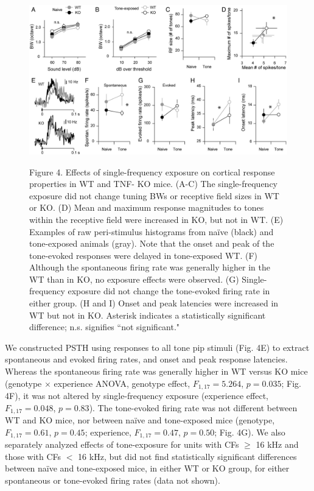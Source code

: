 \begin{figure}[h]
	\centering
		\includegraphics[width=6in]{images/C3F4}
	\begin{changemargin}{1in}{1in}
	\footnotesize{Figure 4. Effects of single-frequency exposure on cortical response properties in WT and TNF-\textalpha{} KO mice. (A-C) The single-frequency exposure did not change tuning BWs or receptive field sizes in WT or KO. (D) Mean and maximum response magnitudes to tones within the receptive field were increased in KO, but not in WT. (E) Examples of raw peri-stimulus histograms from na\"ive (black) and tone-exposed animals (gray). Note that the onset and peak of the tone-evoked responses were delayed in tone-exposed WT. (F) Although the spontaneous firing rate was generally higher in the WT than in KO, no exposure effects were observed. (G) Single-frequency exposure did not change the tone-evoked firing rate in either group. (H and I) Onset and peak latencies were increased in WT but not in KO. Asterisk indicates a statistically significant difference; n.s. signifies ``not significant."}
	\end{changemargin}
\end{figure}

We constructed PSTH using responses to all tone pip stimuli (Fig. 4E) to extract spontaneous and evoked firing rates, and onset and peak response latencies. Whereas the spontaneous firing rate was generally higher in WT versus KO mice (genotype $\times$ experience ANOVA, genotype effect, $F_{1,17}=5.264$, $p=0.035$; Fig. 4F), it was not altered by single-frequency exposure (experience effect, $F_{1,17}=0.048$, $p=0.83$). The tone-evoked firing rate was not different between WT and KO mice, nor between na\"ive and tone-exposed mice (genotype, $F_{1,17}=0.61$, $p=0.45$; experience, $F_{1,17}=0.47$, $p=0.50$; Fig. 4G). We also separately analyzed effects of tone-exposure for units with CFs $\ge$ 16 kHz and those with CFs $<$ 16 kHz, but did not find statistically significant differences between na\"ive and tone-exposed mice, in either WT or KO group, for either spontaneous or tone-evoked firing rates (data not shown).

